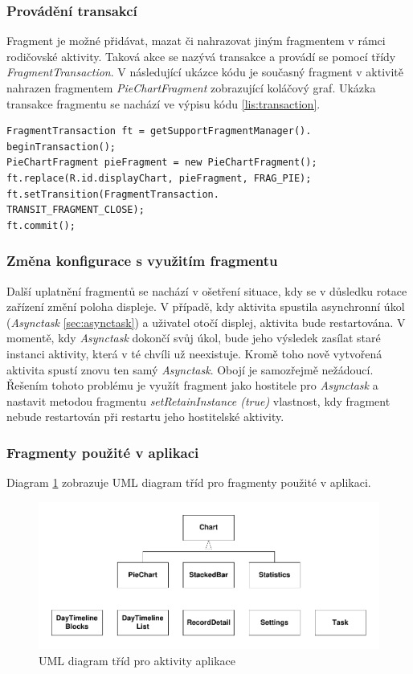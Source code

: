 \documentclass{diplomka}
\begin{document}
\subsubsection*{Provádění transakcí}
Fragment je možné přidávat, mazat či nahrazovat jiným fragmentem v rámci rodičovské aktivity. Taková akce se nazývá transakce a provádí se pomocí třídy \emph{FragmentTransaction}. V následující ukázce kódu je současný fragment v aktivitě nahrazen fragmentem \emph{PieChartFragment} zobrazující koláčový graf. Ukázka transakce fragmentu se nachází ve výpisu kódu \ref{lis:transaction}.

\begin{lstlisting}[label=lis:transaction, caption=Transakce fragmentu]
FragmentTransaction ft = getSupportFragmentManager().
beginTransaction();
PieChartFragment pieFragment = new PieChartFragment();
ft.replace(R.id.displayChart, pieFragment, FRAG_PIE);
ft.setTransition(FragmentTransaction.
TRANSIT_FRAGMENT_CLOSE);
ft.commit();
\end{lstlisting}

\subsubsection*{Změna konfigurace s využitím fragmentu}
Další uplatnění fragmentů se nachází v ošetření situace, kdy se v důsledku rotace zařízení změní poloha displeje. V případě, kdy aktivita spustila asynchronní úkol (\emph{Asynctask} \ref{sec:asynctask}) a uživatel otočí displej, aktivita bude restartována. V momentě, kdy \emph{Asynctask} dokončí svůj úkol, bude jeho výsledek zasílat staré instanci aktivity, která v té chvíli už neexistuje. Kromě toho nově vytvořená aktivita spustí znovu ten samý \emph{Asynctask}. Obojí je samozřejmě nežádoucí. Řešením tohoto problému je využít fragment jako hostitele pro \emph{Asynctask} a nastavit metodou fragmentu \emph{setRetainInstance (true)} vlastnost, kdy fragment nebude restartován při restartu jeho hostitelské aktivity\cite{config}. 

\subsubsection*{Fragmenty použité v aplikaci}

Diagram \ref{fig:fragmentsuml} zobrazuje UML diagram tříd pro fragmenty použité v aplikaci.
\begin{figure}[H]
  \centering
  \includegraphics[scale=0.8]{visio/fragments.pdf}
\caption{UML diagram tříd pro aktivity aplikace}
\label{fig:fragmentsuml}
\end{figure}
\end{document}
